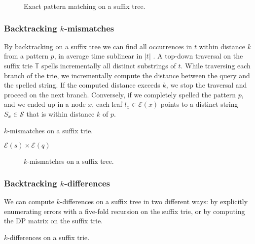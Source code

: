 \begin{figure}[h]
\caption{Exact pattern matching on a suffix tree.}
\label{fig:st-exact}
\end{figure}

\subsubsection{Backtracking $k$-mismatches}

By backtracking \citep{Ukkonen1993, Baeza1999} on a suffix tree we can find all occurrences in $t$ within distance $k$ from a pattern $p$, in average time sublinear in $|t|$ \citep{Navarro2000}.
A top-down traversal on the suffix trie $\mathbb{T}$ spells incrementally all distinct substrings of $t$.
While traversing each branch of the trie, we incrementally compute the distance between the query and the spelled string.
If the computed distance exceeds $k$, we stop the traversal and proceed on the next branch.
Conversely, if we completely spelled the pattern $p$, and we ended up in a node $x$, each leaf $l_x \in \mathcal{E}(x)$ points to a distinct string $S_x \in \mathcal{S}$ that is within distance $k$ of $p$.

\begin{algorithm}[h]
\caption{$k$-mismatches on a suffix trie.}
\label{alg:st-hamming}
\begin{algorithmic}[1]
	\State \Report $\mathcal{E}(s) \times \mathcal{E}(q)$
			\State {}
		\EndIf
	\EndFor
\EndProcedure
\end{algorithmic}
\end{algorithm}

\begin{figure}[h]
\caption{$k$-mismatches on a suffix tree.}
\label{fig:st-hamming}
\end{figure}

\subsubsection{Backtracking $k$-differences}

We can compute $k$-differences on a suffix tree in two different ways: by explicitly enumerating errors with a five-fold recursion on the suffix trie, or by computing the DP matrix on the suffix trie.

\begin{algorithm}
\caption{$k$-differences on a suffix trie.}
\label{alg:st-edit}
\end{algorithm}

